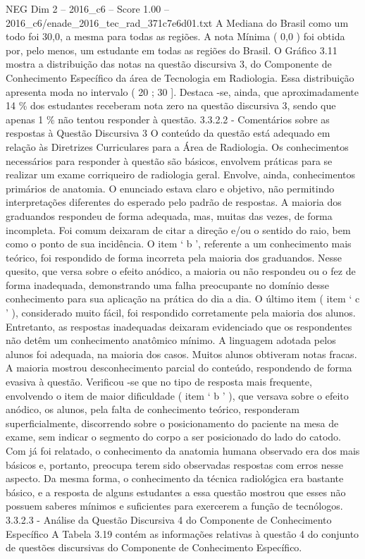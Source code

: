 \begin{textsample}{NEG Dim 2 – 2016\_c6 – Score 1.00 – 2016\_c6/enade\_2016\_tec\_rad\_371c7e6d01.txt}
A Mediana do Brasil como um todo foi 30,0, a mesma para todas as regiões.
A nota Mínima ( 0,0 ) foi obtida por, pelo menos, um estudante em todas as regiões do Brasil.
O Gráfico 3.11 mostra a distribuição das notas na questão discursiva 3, do Componente de Conhecimento Específico da área de Tecnologia em Radiologia.
Essa distribuição apresenta moda no intervalo ( 20 ; 30 ].
Destaca -se, ainda, que aproximadamente 14 \% dos estudantes receberam nota zero na questão discursiva 3, sendo que apenas 1 \% não tentou responder à questão. 3.3.2.2 - Comentários sobre as respostas à Questão Discursiva 3 O conteúdo da questão está adequado em relação às Diretrizes Curriculares para a Área de Radiologia.
Os conhecimentos necessários para responder à questão são básicos, envolvem práticas para se realizar um exame corriqueiro de radiologia geral.
Envolve, ainda, conhecimentos primários de anatomia.
O enunciado estava claro e objetivo, não permitindo interpretações diferentes do esperado pelo padrão de respostas.
A maioria dos graduandos respondeu de forma adequada, mas, muitas das vezes, de forma incompleta.
Foi comum deixaram de citar a direção e/ou o sentido do raio, bem como o ponto de sua incidência.
O item ‘ b ’, referente a um conhecimento mais teórico, foi respondido de forma incorreta pela maioria dos graduandos.
Nesse quesito, que versa sobre o efeito anódico, a maioria ou não respondeu ou o fez de forma inadequada, demonstrando uma falha preocupante no domínio desse conhecimento para sua aplicação na prática do dia a dia.
O último item ( item ‘ c ’ ), considerado muito fácil, foi respondido corretamente pela maioria dos alunos.
Entretanto, as respostas inadequadas deixaram evidenciado que os respondentes não detêm um conhecimento anatômico mínimo.
A linguagem adotada pelos alunos foi adequada, na maioria dos casos.
Muitos alunos obtiveram notas fracas.
A maioria mostrou desconhecimento parcial do conteúdo, respondendo de forma evasiva à questão.
Verificou -se que no tipo de resposta mais frequente, envolvendo o item de maior dificuldade ( item ‘ b ’ ), que versava sobre o efeito anódico, os alunos, pela falta de conhecimento teórico, responderam superficialmente, discorrendo sobre o posicionamento do paciente na mesa de exame, sem indicar o segmento do corpo a ser posicionado do lado do catodo.
Com já foi relatado, o conhecimento da anatomia humana observado era dos mais básicos e, portanto, preocupa terem sido observadas respostas com erros nesse aspecto.
Da mesma forma, o conhecimento da técnica radiológica era bastante básico, e a resposta de alguns estudantes a essa questão mostrou que esses não possuem saberes mínimos e suficientes para exercerem a função de tecnólogos. 3.3.2.3 - Análise da Questão Discursiva 4 do Componente de Conhecimento Específico A Tabela 3.19 contém as informações relativas à questão 4 do conjunto de questões discursivas do Componente de Conhecimento Específico.

\end{textsample}
